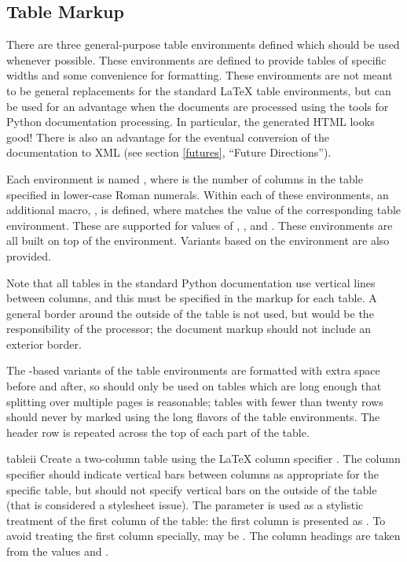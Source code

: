 \documentclass{howto}
\begin{document}
  \subsection{Table Markup \label{table-markup}}

    There are three general-purpose table environments defined which
    should be used whenever possible.  These environments are defined
    to provide tables of specific widths and some convenience for
    formatting.  These environments are not meant to be general
    replacements for the standard \LaTeX{} table environments, but can
    be used for an advantage when the documents are processed using
    the tools for Python documentation processing.  In particular, the
    generated HTML looks good!  There is also an advantage for the
    eventual conversion of the documentation to XML (see section
    \ref{futures}, ``Future Directions'').

    Each environment is named , where 
    is the number of columns in the table specified in lower-case
    Roman numerals.  Within each of these environments, an additional
    macro, , is defined, where 
    matches the  value of the corresponding table
    environment.  These are supported for  values of
    , , and .  These environments are all
    built on top of the  environment.  Variants based on
    the  environment are also provided.

    Note that all tables in the standard Python documentation use
    vertical lines between columns, and this must be specified in the
    markup for each table.  A general border around the outside of the
    table is not used, but would be the responsibility of the
    processor; the document markup should not include an exterior
    border.

    The -based variants of the table environments are
    formatted with extra space before and after, so should only be
    used on tables which are long enough that splitting over multiple
    pages is reasonable; tables with fewer than twenty rows should
    never by marked using the long flavors of the table environments.
    The header row is repeated across the top of each part of the
    table.

    \begin{envdesc}{tableii}{}
      Create a two-column table using the \LaTeX{} column specifier
      .  The column specifier should indicate vertical
      bars between columns as appropriate for the specific table, but
      should not specify vertical bars on the outside of the table
      (that is considered a stylesheet issue).  The 
      parameter is used as a stylistic treatment of the first column
      of the table: the first column is presented as
      .  To avoid treating the first
      column specially,  may be .  The
      column headings are taken from the values  and
      .
    \end{envdesc}
\end{document}

